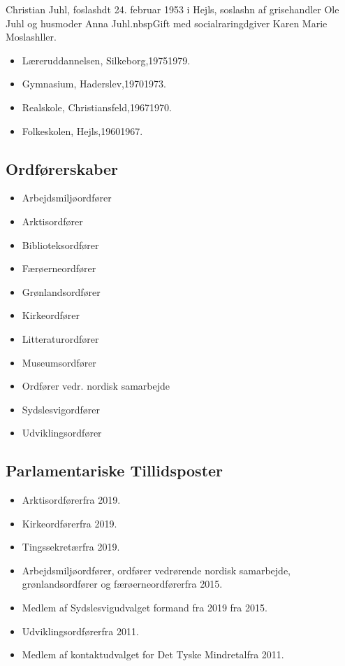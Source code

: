 \documentclass[11pt, a4paper]{awesome-cv}
\begin{document}
\makecvheader[R]
\makelettertitle
\begin{cvletter}
Christian Juhl, foslashdt 24. februar 1953 i Hejls, soslashn af grisehandler Ole Juhl og husmoder Anna Juhl.nbspGift med socialraringdgiver Karen Marie Moslashller.

\begin{itemize}
\item Læreruddannelsen, Silkeborg,19751979.
\item Gymnasium, Haderslev,19701973.
\item Realskole, Christiansfeld,19671970.
\item Folkeskolen, Hejls,19601967.
\end{itemize}
\subsection*{Ordførerskaber}
\begin{itemize}
\item Arbejdsmiljøordfører
\item Arktisordfører
\item Biblioteksordfører
\item Færøerneordfører
\item Grønlandsordfører
\item Kirkeordfører
\item Litteraturordfører
\item Museumsordfører
\item Ordfører vedr. nordisk samarbejde
\item Sydslesvigordfører
\item Udviklingsordfører
\end{itemize}
\subsection*{Parlamentariske Tillidsposter}
\begin{itemize}
\item Arktisordførerfra 2019.
\item Kirkeordførerfra 2019.
\item Tingssekretærfra 2019.
\item Arbejdsmiljøordfører, ordfører vedrørende nordisk samarbejde, grønlandsordfører og færøerneordførerfra 2015.
\item Medlem af Sydslesvigudvalget formand fra 2019 fra 2015.
\item Udviklingsordførerfra 2011.
\item Medlem af kontaktudvalget for Det Tyske Mindretalfra 2011.
\end{itemize}

\end{cvletter}
\end{document}
